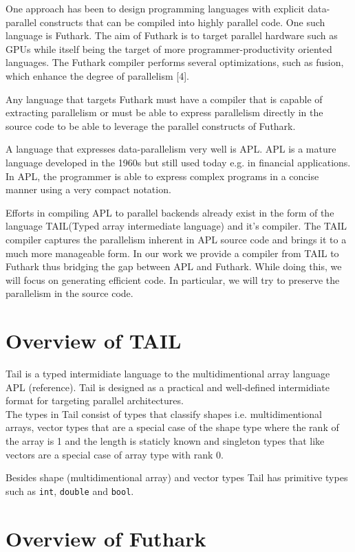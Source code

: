 \documentclass[11pt]{article}
\begin{document}
One approach has been to design programming languages with explicit data-parallel constructs that can be compiled into highly parallel code. One such language is Futhark. The aim of Futhark is to target parallel hardware such as GPUs while itself being the target of more programmer-productivity oriented languages. The Futhark compiler performs several optimizations, such as fusion, which enhance the degree of parallelism [4].

Any language that targets Futhark must have a compiler that is capable of extracting parallelism or must be able to express parallelism directly in the source code to be able to leverage the parallel constructs of Futhark.

A language that expresses data-parallelism very well is APL. APL is a mature language developed in the 1960s but still used today e.g. in financial applications. In APL, the programmer is able to express complex programs in a concise manner using a very compact notation.

Efforts in compiling APL to parallel backends already exist in the form of the language TAIL(Typed array intermediate language) and it’s compiler. The TAIL compiler captures the parallelism inherent in APL source code and brings it to a much more manageable form. In our work we provide a compiler from TAIL to Futhark thus bridging the gap between APL and Futhark. While doing  this, we will focus on generating efficient code. In particular, we will try to preserve the parallelism in the source code.

\section{Overview of TAIL}
Tail is a typed intermidiate language to the multidimentional array language APL (reference). Tail is designed as a practical and well-defined intermidiate format for targeting parallel architectures.\\ 

The types in Tail consist of types that classify shapes i.e. multidimentional arrays, vector types that are a special case of the shape type where the rank of the array is 1 and the length is staticly known and singleton types that like vectors are a special case of array type with rank 0. 

Besides shape (multidimentional array) and vector types Tail has primitive types such as \verb|int|, \verb|double| and \verb|bool|.

\section{Overview of Futhark}
\end{document}
